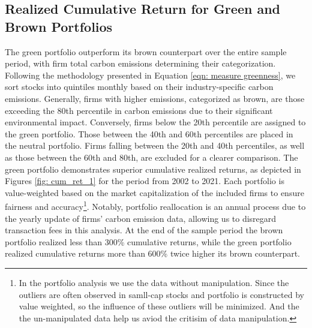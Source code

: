 \documentclass[12pt]{article}
\begin{document}
\subsection{Realized Cumulative Return for Green and Brown Portfolios}
\label{sec: result2}
The green portfolio outperform its brown counterpart over the entire sample period, with firm total carbon emissions determining their categorization. Following the methodology presented in Equation \ref{eqn: measure greenness}, we sort stocks into quintiles monthly based on their industry-specific carbon emissions. Generally, firms with higher emissions, categorized as brown, are those exceeding the 80th percentile in carbon emissions due to their significant environmental impact. Conversely, firms below the 20th percentile are assigned to the green portfolio. Those between the 40th and 60th percentiles are placed in the neutral portfolio. Firms falling between the 20th and 40th percentiles, as well as those between the 60th and 80th, are excluded for a clearer comparison. The green portfolio demonstrates superior cumulative realized returns, as depicted in Figures \ref{fig: cum_ret_1} for the period from 2002 to 2021. Each portfolio is value-weighted based on the market capitalization of the included firms to ensure fairness and accuracy\footnote{In the portfolio analysis we use the data without manipulation. Since the outliers are often observed in samll-cap stocks and portfolio is constructed by value weighted, so the influence of these outliers will be minimized. And the the un-manipulated data help us aviod the critisim of data manipulation.}. Notably, portfolio reallocation is an annual process due to the yearly update of firms' carbon emission data, allowing us to disregard transaction fees in this analysis. At the end of the sample period the brown portfolio realized less than 300\% cumulative returns, while the green portfolio realized cumulative returns more than 600\% twice higher its brown counterpart.
\end{document}
